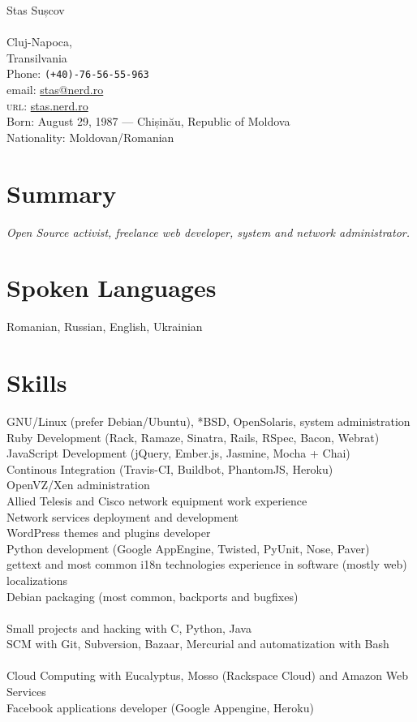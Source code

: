 \documentclass[10pt, a4paper]{article}
\begin{document}
{\LARGE Stas Sușcov}\\[1cm]
\\
 Cluj-Napoca,\\
Transilvania\\[.2cm]
Phone: \texttt{(+40)-76-56-55-963}\\[.2cm]
email: \href{mailto:stas@nerd.ro}{stas@nerd.ro}\\
\textsc{url}: \href{http://stas.nerd.ro/index.php/about/}{stas.nerd.ro}\\ 
\vfill
 Born:  August 29, 1987 --- Chișinău, Republic of Moldova\\
Nationality:  Moldovan/Romanian

\section*{Summary}
\emph{Open Source activist, freelance web developer, system and network administrator.} 

\section*{Spoken Languages}
 Romanian, Russian, English, Ukrainian

\section*{Skills}
 GNU/Linux (prefer Debian/Ubuntu), *BSD, OpenSolaris, system administration\\
Ruby Development (Rack, Ramaze, Sinatra, Rails, RSpec, Bacon, Webrat)\\
JavaScript Development (jQuery, Ember.js, Jasmine, Mocha + Chai)\\
Continous Integration (Travis-CI, Buildbot, PhantomJS, Heroku)\\
OpenVZ/Xen administration\\
Allied Telesis and Cisco network equipment work experience\\
Network services deployment and development\\
WordPress themes and plugins developer\\
Python development (Google AppEngine, Twisted, PyUnit, Nose, Paver)\\
gettext and most common i18n technologies experience in software (mostly web) localizations\\
Debian packaging (most common, backports and bugfixes)\\
\\
Small projects and hacking with C, Python, Java\\
SCM with Git, Subversion, Bazaar, Mercurial and automatization with Bash\\
\\
Cloud Computing with Eucalyptus, Mosso (Rackspace Cloud) and Amazon Web Services
\\
Facebook applications developer (Google Appengine, Heroku)
\end{document}
